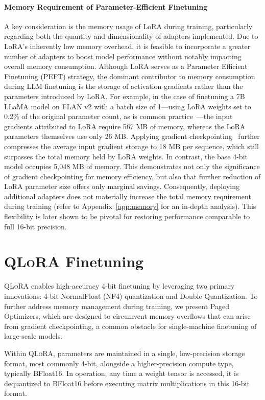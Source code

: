 \paragraph{Memory Requirement of Parameter-Efficient Finetuning} A key consideration is the memory usage of LoRA during training, particularly regarding both the quantity and dimensionality of adapters implemented. Due to LoRA’s inherently low memory overhead, it is feasible to incorporate a greater number of adapters to boost model performance without notably impacting overall memory consumption. Although LoRA serves as a Parameter Efficient Finetuning (PEFT) strategy, the dominant contributor to memory consumption during LLM finetuning is the storage of activation gradients rather than the parameters introduced by LoRA. For example, in the case of finetuning a 7B LLaMA model on FLAN v2 with a batch size of 1—using LoRA weights set to 0.2\% of the original parameter count, as is common practice~\citep{hu2021lora,liu2022few}—the input gradients attributed to LoRA require 567 MB of memory, whereas the LoRA parameters themselves use only 26 MB. Applying gradient checkpointing~\citep{chen2016training} further compresses the average input gradient storage to 18 MB per sequence, which still surpasses the total memory held by LoRA weights. In contrast, the base 4-bit model occupies 5,048 MB of memory. This demonstrates not only the significance of gradient checkpointing for memory efficiency, but also that further reduction of LoRA parameter size offers only marginal savings. Consequently, deploying additional adapters does not materially increase the total memory requirement during training (refer to Appendix~\ref{app:memory} for an in-depth analysis). This flexibility is later shown to be pivotal for restoring performance comparable to full 16-bit precision.

\section{\textsc{QLoRA} Finetuning}

\textsc{QLoRA} enables high-accuracy 4-bit finetuning by leveraging two primary innovations: 4-bit NormalFloat (NF4) quantization and Double Quantization. To further address memory management during training, we present Paged Optimizers, which are designed to circumvent memory overflows that can arise from gradient checkpointing, a common obstacle for single-machine finetuning of large-scale models.

Within \textsc{QLoRA}, parameters are maintained in a single, low-precision storage format, most commonly 4-bit, alongside a higher-precision compute type, typically BFloat16. In operation, any time a weight tensor is accessed, it is dequantized to BFloat16 before executing matrix multiplications in this 16-bit format.

